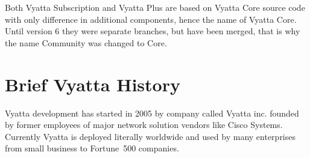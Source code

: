 Both Vyatta Subscription and Vyatta Plus are based on Vyatta Core source code with only difference in additional
components, hence the name of Vyatta Core. Until version 6 they were separate branches, but have been merged, 
that is why the name Community was changed to Core.

\section{Brief Vyatta History}
Vyatta development has started in 2005 by company called Vyatta inc. founded by former employees of major network
solution vendors like Cisco Systems. Currently Vyatta is deployed literally worldwide and used by many enterprises 
from small business to Fortune~500 companies. 
